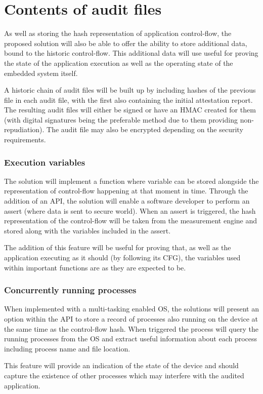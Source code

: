 \section{Contents of audit files}

As well as storing the hash representation of application control-flow, the proposed solution will also be able to offer the ability to store additional data, bound to the historic control-flow. This additional data will use useful for proving the state of the application execution as well as the operating state of the embedded system itself.

A historic chain of audit files will be built up by including hashes of the previous file in each audit file, with the first also containing the initial attestation report. The resulting audit files will either be signed or have an HMAC created for them (with digital signatures being the preferable method due to them providing non-repudiation). The audit file may also be encrypted depending on the security requirements. 

\subsubsection*{Execution variables}

The solution will implement a function where variable can be stored alongside the representation of control-flow happening at that moment in time. Through the addition of an API, the solution will enable a software developer to perform an assert (where data is sent to secure world). When an assert is triggered, the hash representation of the control-flow will be taken from the measurement engine and stored along with the variables included in the assert.

The addition of this feature will be useful for proving that, as well as the application executing as it should (by following its CFG), the variables used within important functions are as they are expected to be.

\subsubsection*{Concurrently running processes}

When implemented with a multi-tasking enabled OS, the solutions will present an option within the API to store a record of processes also running on the device  at the same time as the control-flow hash. When triggered the process will query the running processes from the OS and extract useful information about each process including process name and file location.

This feature will provide an indication of the state of the device and should capture the existence of other processes which may interfere with the audited application. 
